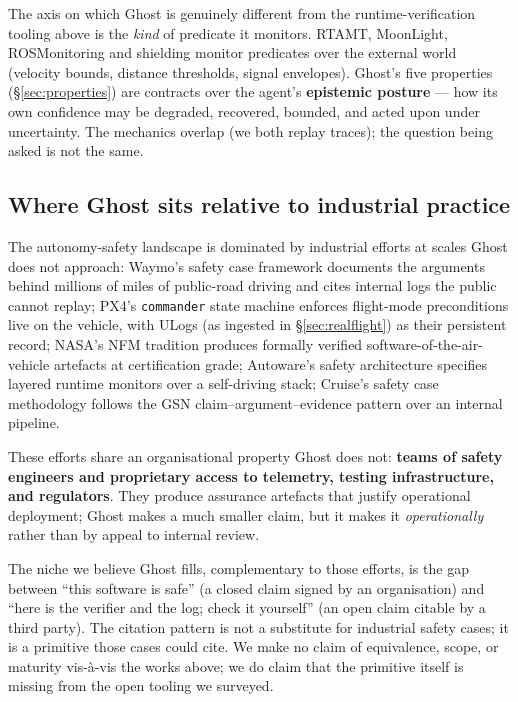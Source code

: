 \documentclass[acmsmall,nonacm=true,review=false]{acmart}
\theoremstyle{plain}
\begin{document}
The axis on which Ghost is genuinely different from the
runtime-verification tooling above is the \emph{kind} of
predicate it monitors. RTAMT, MoonLight, ROSMonitoring and
shielding monitor predicates over the external world (velocity
bounds, distance thresholds, signal envelopes). Ghost's five
properties (\S\ref{sec:properties}) are contracts over the
agent's \textbf{epistemic posture} --- how its own confidence may
be degraded, recovered, bounded, and acted upon under
uncertainty. The mechanics overlap (we both replay traces); the
question being asked is not the same.

\subsection{Where Ghost sits relative to industrial practice}
\label{sec:industrial}

The autonomy-safety landscape is dominated by industrial efforts at
scales Ghost does not approach: Waymo's safety case framework
documents the arguments behind millions of miles of public-road
driving and cites internal logs the public cannot replay; PX4's
\texttt{commander} state machine enforces
flight-mode preconditions live on the vehicle, with ULogs (as
ingested in \S\ref{sec:realflight}) as their persistent record;
NASA's NFM tradition produces formally verified
software-of-the-air-vehicle artefacts at certification grade;
Autoware's safety architecture specifies layered runtime monitors
over a self-driving stack; Cruise's safety case methodology follows
the GSN claim--argument--evidence pattern over an internal pipeline.

These efforts share an organisational property Ghost does not:
\textbf{teams of safety engineers and proprietary access to telemetry,
testing infrastructure, and regulators}. They produce assurance
artefacts that justify operational deployment; Ghost makes a much
smaller claim, but it makes it \emph{operationally} rather than by
appeal to internal review.

The niche we believe Ghost fills, complementary to those efforts, is
the gap between ``this software is safe'' (a closed claim signed by
an organisation) and ``here is the verifier and the log; check it
yourself'' (an open claim citable by a third party). The citation
pattern is not a substitute for industrial safety cases; it is a
primitive those cases could cite. We make no claim of equivalence,
scope, or maturity vis-à-vis the works above; we do claim that the
primitive itself is missing from the open tooling we surveyed.
\end{document}
